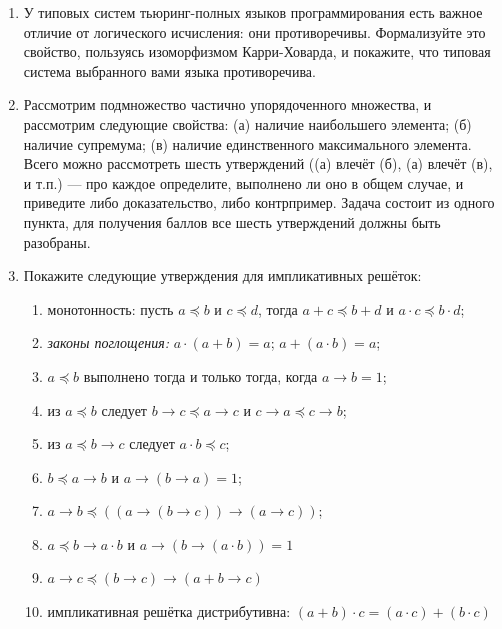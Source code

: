 \documentclass[10pt,a4paper,oneside]{article}
\begin{document}
\begin{enumerate}
Предложите (любую разумную) формальную теорию (какую-то модификацию ИВ), 
в которой данная эквивалентность утверждений теряет смысл или становится недоказуемой. Также докажите, что КИВ и ИИВ непротиворечивы. 

\item У типовых систем тьюринг-полных языков программирования
есть важное отличие от логического исчисления: 
они противоречивы. Формализуйте это свойство, пользуясь изоморфизмом Карри-Ховарда, и 
покажите, что типовая система выбранного вами языка противоречива.

\item Рассмотрим подмножество частично упорядоченного множества, и рассмотрим следующие свойства:
(а) наличие наибольшего элемента; (б) наличие супремума;
(в) наличие единственного максимального элемента. Всего можно рассмотреть шесть утверждений ((а) влечёт (б), 
(а) влечёт (в), и т.п.) --- про каждое определите, выполнено ли оно в общем случае,
и приведите либо доказательство, либо контрпример. Задача состоит из одного пункта, для получения баллов 
все шесть утверждений должны быть разобраны.

\item Покажите следующие утверждения для импликативных решёток:
\begin{enumerate}
\item монотонность: пусть $a \preceq b$ и $c \preceq d$, тогда $a + c \preceq b + d$ и $a \cdot c \preceq b \cdot d$;
\item \emph{законы поглощения:} $a \cdot (a + b) = a$; $a + (a \cdot b) = a$;
\item $a \preceq b$ выполнено тогда и только тогда, когда $a \rightarrow b = 1$;
\item из $a \preceq b$ следует $b\rightarrow c \preceq a\rightarrow c$ и $c\rightarrow a \preceq c \rightarrow b$;
\item из $a \preceq b \rightarrow c$ следует $a \cdot b \preceq c$;
\item $b \preceq a \rightarrow b$ и $a \rightarrow (b \rightarrow a) = 1$;
\item $a \rightarrow b \preceq ((a \rightarrow (b \rightarrow c)) \rightarrow (a \rightarrow c))$;
\item $a \preceq b \rightarrow a \cdot b$ и $a \rightarrow (b \rightarrow (a \cdot b)) = 1$
\item $a \rightarrow c \preceq (b \rightarrow c) \rightarrow (a + b \rightarrow c)$
\item импликативная решётка дистрибутивна: $(a + b) \cdot c = (a \cdot c) + (b \cdot c)$
\end{enumerate}


\end{enumerate}
\end{document}
